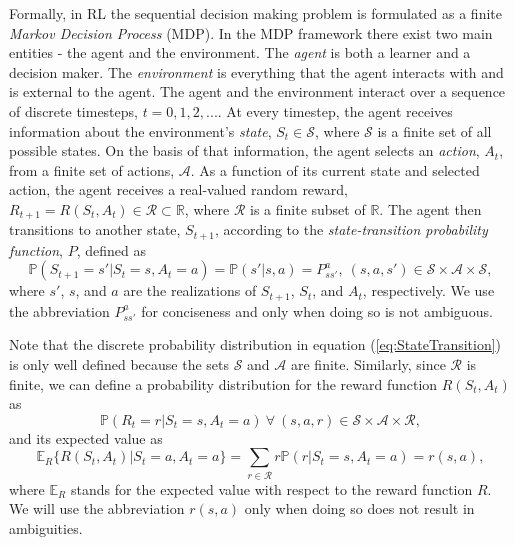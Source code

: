 Formally, in RL the sequential decision making problem is formulated as a finite \textit{Markov Decision Process} (MDP).
In the MDP framework there exist two main entities - the agent and the environment.
The \textit{agent} is both a learner and a decision maker.
The \textit{environment} is everything that the agent interacts with and is external to the agent. 
The agent and the environment interact over a sequence of discrete timesteps, $t=0,1,2,...$. 
At every timestep, the agent receives information about the environment's \textit{state}, $S_t \in \mathcal{S}$, where $\mathcal{S}$ is a finite set of all possible states. 
On the basis of that information, the agent selects an \textit{action}, $A_t$, from a finite set of actions, $\mathcal{A}$.
As a function of its current state and selected action, the agent receives a real-valued random reward, $R_{t+1} = R(S_t,A_t) \in \mathcal{R} \subset \mathbb{R}$, where $\mathcal{R}$ is a finite subset of $\mathbb{R}$.
The agent then transitions to another state, $S_{t+1}$, according to the \textit{state-transition probability function}, $P$, defined as
%
\begin{equation}
\label{eq:StateTransition}
\mathbb{P}(S_{t+1} = s' | S_t = s, A_t = a) = \mathbb{P}(s'|s,a) = P^a_{ss'}, \ 
	(s,a,s') \in	\mathcal{S} \times \mathcal{A} \times \mathcal{S},
\end{equation}
where $s'$, $s$, and $a$ are the realizations of $S_{t+1}$, $S_t$, and $A_t$, respectively. 
We use the abbreviation $P^a_{ss'}$ for conciseness and only when doing so is not ambiguous.

Note that the discrete probability distribution in equation (\ref{eq:StateTransition}) is only well defined because the sets $\mathcal{S}$ and $\mathcal{A}$ are finite.
Similarly, since $\mathcal{R}$ is finite, we can define a probability distribution for the reward function $R(S_t,A_t)$ as
%
\begin{equation}
\label{eq:RewardFunc}
\mathbb{P}(R_t = r | S_t = s, A_t = a) \ \forall \ (s,a,r) \in \mathcal{S} \times \mathcal{A} \times \mathcal{R},
\end{equation}
and its expected value as
%
\begin{equation}
\label{eq:RewardEV}
\mathbb{E}_R \{ R(S_t, A_t) | S_t = a, A_t = a \} = \sum_{r \in \mathcal{R}} r \mathbb{P}(r| S_t =s, A_t=a)
	= r(s,a),
\end{equation}
where $\mathbb{E}_R$ stands for the expected value with respect to the reward function $R$.
We will use the abbreviation $r(s,a)$ only when doing so does not result in ambiguities.

